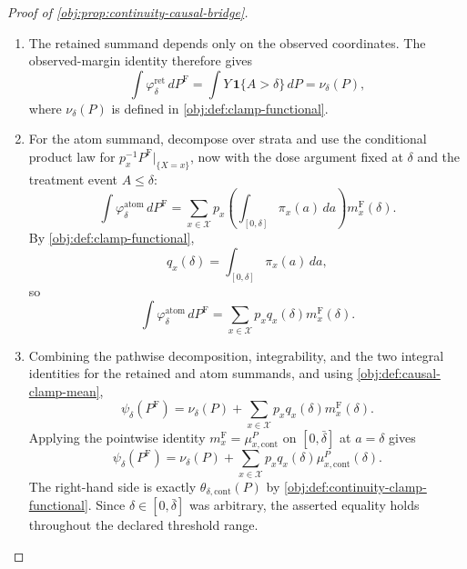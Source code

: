 \documentclass[11pt]{article}
\begin{document}
\begin{proof}[Proof of \cref{obj:prop:continuity-causal-bridge}]
\begin{enumerate}
\item The retained summand depends only on the observed coordinates.  The observed-margin identity therefore gives
\[
\int \varphi_{\delta}^{\mathrm{ret}}\,dP^{\mathrm F}
=
\int Y\,\mathbf 1\{A>\delta\}\,dP
=
\nu_\delta(P),
\]
where \(\nu_\delta(P)\) is defined in \cref{obj:def:clamp-functional}.

\item For the atom summand, decompose over strata and use the conditional product law for \(p_x^{-1}P^{\mathrm F}|_{\{X=x\}}\), now with the dose argument fixed at \(\delta\) and the treatment event \(A\le\delta\):
\[
\int \varphi_{\delta}^{\mathrm{atom}}\,dP^{\mathrm F}
=
\sum_{x\in\mathcal X}
p_x
\left(\int_{[0,\delta]}\pi_x(a)\,da\right)
m_x^{\mathrm F}(\delta).
\]
By \cref{obj:def:clamp-functional},
\[
q_x(\delta)=\int_{[0,\delta]}\pi_x(a)\,da,
\]
so
\[
\int \varphi_{\delta}^{\mathrm{atom}}\,dP^{\mathrm F}
=
\sum_{x\in\mathcal X}p_x q_x(\delta)m_x^{\mathrm F}(\delta).
\]

\item Combining the pathwise decomposition, integrability, and the two integral identities for the retained and atom summands, and using \cref{obj:def:causal-clamp-mean},
\[
\psi_\delta(P^{\mathrm F})
=
\nu_\delta(P)
+
\sum_{x\in\mathcal X}p_x q_x(\delta)m_x^{\mathrm F}(\delta).
\]
Applying the pointwise identity \(m_x^{\mathrm F}=\mu_{x,\mathrm{cont}}^P\) on \([0,\bar\delta]\) at \(a=\delta\) gives
\[
\psi_\delta(P^{\mathrm F})
=
\nu_\delta(P)
+
\sum_{x\in\mathcal X}p_x q_x(\delta)\mu_{x,\mathrm{cont}}^P(\delta).
\]
The right-hand side is exactly \(\theta_{\delta,\mathrm{cont}}(P)\) by \cref{obj:def:continuity-clamp-functional}.  Since \(\delta\in[0,\bar\delta]\) was arbitrary, the asserted equality holds throughout the declared threshold range.
\end{enumerate}
\end{proof}
\end{document}
